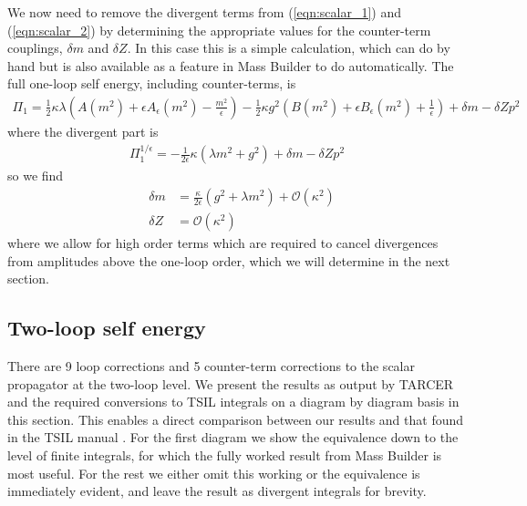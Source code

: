 \documentclass[11pt]{article}
\newcommand{\mb}{\textsf{Mass Builder} }
\newcommand{\tsil}{\textsf{TSIL} }
\newcommand{\tarcer}{\textsf{TARCER} }
\begin{document}
We now need to remove the divergent terms from (\ref{eqn:scalar_1}) and (\ref{eqn:scalar_2}) by determining the appropriate values for the counter-term couplings, $\delta m$ and $\delta Z$.  In this case this is a simple calculation, which can do by hand but is also available as a feature in \mb to do automatically.  The full one-loop self energy, including counter-terms, is
 \begin{align}
 \Pi_1 = \frac{1}{2}\kappa\lambda\left(A(m^2)+\epsilon A_{\epsilon}(m^2)-\frac{m^2}{\epsilon}\right)- \frac{1}{2}\kappa g^2\left(B(m^2)+\epsilon B_{\epsilon}(m^2)+\frac{1}{\epsilon}\right)+ \delta m - \delta Z p^2
 \end{align}
where the divergent part is
\begin{align}
\Pi_1^{1/\epsilon}=  -\frac{1}{2\epsilon}\kappa\left(\lambda m^2+g^2\right)+ \delta m - \delta Z p^2
\end{align}
so we find
\begin{eqnarray}
&\delta m &=\frac{\kappa}{2\epsilon} \left(g^2+\lambda m^2\right)+\mathcal{O}(\kappa^2)\\
&\delta Z &= \mathcal{O}(\kappa^2)
\end{eqnarray}
where we allow for high order terms which are required to cancel divergences from amplitudes above the one-loop order, which we will determine in the next section.\\

\subsection{Two-loop self energy}

There are 9 loop corrections and 5 counter-term corrections to the scalar propagator at the two-loop level.  We present the results as output by \tarcer and the required conversions to \tsil integrals on a diagram by diagram basis in this section.  This enables a direct comparison between our results and that found in the \tsil manual \cite{Martin2006}.  For the first diagram we show the equivalence down to the level of finite integrals, for which the fully worked result from \mb is most useful.  For the rest we either omit this working or the equivalence is immediately evident, and leave the result as divergent integrals for brevity.
\end{document}
